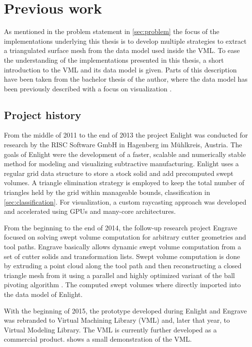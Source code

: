 \chapter{Previous work}
\label{ch:previous_work}

As mentioned in the problem statement in \cref{sec:problem} the focus of the implementations underlying this thesis is to develop multiple strategies to extract a triangulated surface mesh from the data model used inside the VML.
To ease the understanding of the implementations presented in this thesis, a short introduction to the VML and its data model is given.
Parts of this description have been taken from the bachelor thesis of the author, where the data model has been previously described with a focus on visualization \cite{bachelor}.

\section{Project history}
\label{sec:project_history}

From the middle of 2011 to the end of 2013 the project Enlight was conducted for research by the RISC Software GmbH in Hagenberg im Mühlkreis, Austria.
The goals of Enlight were the development of a faster, scalable and numerically stable method for modeling and visualizing subtractive manufacturing.
Enlight uses a regular grid data structure to store a stock solid and add precomputed swept volumes.
A triangle elimination strategy is employed to keep the total number of triangles held by the grid within manageable bounds, \cf classification in \cref{sec:classification}.
For visualization, a custom raycasting approach was developed \cite{enlight} and accelerated using GPUs and many-core architectures.

From the beginning to the end of 2014, the follow-up research project Engrave focused on solving swept volume computation for arbitrary cutter geometries and tool paths.
Engrave basically allows dynamic swept volume computation from a set of cutter solids and transformation lists.
Swept volume computation is done by extruding a point cloud along the tool path and then reconstructing a closed triangle mesh from it using a parallel and highly optimized variant of the ball pivoting algorithm \cite{engrave}.
The computed swept volumes where directly imported into the data model of Enlight.

With the beginning of 2015, the prototype developed during Enlight and Engrave was rebranded to Virtual Machining Library (VML) and, later that year, to Virtual Modeling Library.
The VML is currently further developed as a commercial product.
 shows a small demonstration of the VML.

